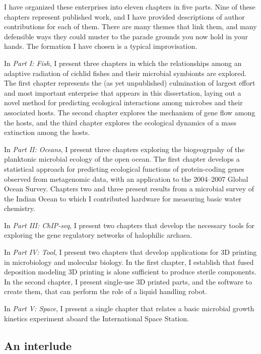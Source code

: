 I have organized these enterprises into eleven chapters in five parts. Nine of these chapters represent published work, and I have provided descriptions of author contributions for each of them. There are many themes that link them, and many defensible ways they could muster to the parade grounds you now hold in your hands. The formation I have chosen is a typical improvisation.

In {\em Part I: Fish}, I present three chapters in which the relationships among an adaptive radiation of cichlid fishes and their microbial symbionts are explored. The first chapter represents the (as yet unpublished) culmination of largest effort and most important enterprise that appears in this dissertation, laying out a novel method for predicting ecological interactions among microbes and their associated hosts. The second chapter explores the mechanism of gene flow among the hosts, and the third chapter explores the ecological dynamics of a mass extinction among the hosts.

In {\em Part II: Oceans}, I present three chapters exploring the biogeogrpahy of the planktonic microbial ecology of the open ocean. The first chapter develops a statistical approach for predicting ecological functions of protein-coding genes observed from metagenomic data, with an application to the 2004--2007 Global Ocean Survey. Chapters two and three present results from a microbial survey of the Indian Ocean to which I contributed hardware for measuring basic water chemistry.

In {\em Part III: ChIP-seq}, I present two chapters that develop the necessary tools for exploring the gene regulatory networks of halophilic archaea.

In {\em Part IV: Tool}, I present two chapters that develop applications for 3D printing in microbiology and molecular biology. In the first chapter, I establish that fused deposition modeling 3D printing is alone sufficient to produce sterile components. In the second chapter, I present single-use 3D printed parts, and the software to create them, that can perform the role of a liquid handling robot. 

In {\em Part V: Space}, I present a single chapter that relates a basic microbial growth kinetics experiment aboard the International Space Station.

\subsection*{An interlude}

